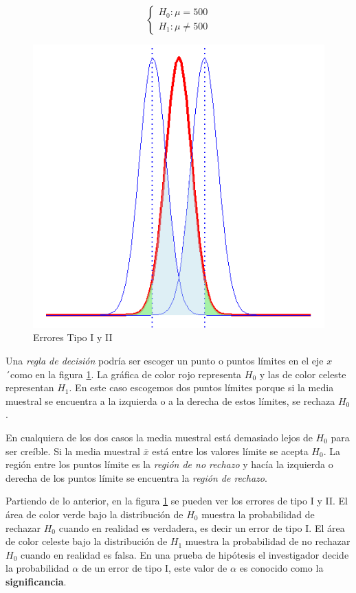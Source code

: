 \documentclass[
]{krantz}
\begin{document}
\begin{equation} 
\begin{cases} 
H_0: \mu = 500 \\ 
H_1: \mu \neq 500
\end{cases} 
\end{equation}

\begin{figure}[h!]

{\centering \includegraphics[width=0.5\linewidth]{phtest} 

}

\caption{Errores Tipo I y II}\label{fig:pht}
\end{figure}

Una \emph{regla de decisión} podría ser escoger un punto o puntos límites en el eje \(x\)´como en la figura \ref{fig:pht}. La gráfica de color rojo representa \(H_0\) y las de color celeste representan \(H_1\). En este caso escogemos dos puntos límites porque si la media muestral se encuentra a la izquierda o a la derecha de estos límites, se rechaza \(H_0\).

En cualquiera de los dos casos la media muestral está demasiado lejos de \(H_0\) para ser creíble. Si la media muestral \(\bar{x}\) está entre los valores límite se acepta \(H_0\). La región entre los puntos límite es la \emph{región de no rechazo} y hacía la izquierda o derecha de los puntos límite se encuentra la \emph{región de rechazo}.

Partiendo de lo anterior, en la figura \ref{fig:pht} se pueden ver los errores de tipo I y II. El área de color verde bajo la distribución de \(H_0\) muestra la probabilidad de rechazar \(H_0\) cuando en realidad es verdadera, es decir un error de tipo I. El área de color celeste bajo la distribución de \(H_1\) muestra la probabilidad de no rechazar \(H_0\) cuando en realidad es falsa. En una prueba de hipótesis el investigador decide la probabilidad \(\alpha\) de un error de tipo I, este valor de \(\alpha\) es conocido como la \textbf{significancia}.
\end{document}
